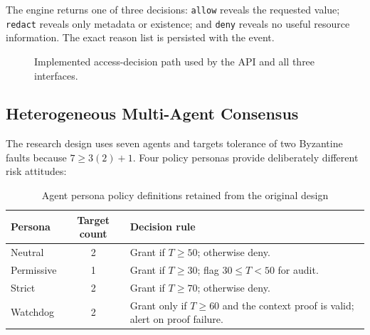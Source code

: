 \documentclass[10pt]{article}
\begin{document}
The engine returns one of three decisions: \texttt{allow} reveals the requested value; \texttt{redact} reveals only metadata or existence; and \texttt{deny} reveals no useful resource information. The exact reason list is persisted with the event.

\begin{figure}[ht]
\centering
{}
\caption{Implemented access-decision path used by the API and all three interfaces.}
\label{fig:decision}
\end{figure}

\subsection*{Heterogeneous Multi-Agent Consensus}

The research design uses seven agents and targets tolerance of two Byzantine faults because $7\geq 3(2)+1$. Four policy personas provide deliberately different risk attitudes:

\begin{table}[ht]
\centering
\caption{Agent persona policy definitions retained from the original design}
\label{tab:personas}
\begin{tabularx}{\textwidth}{l c Y}
\toprule
\textbf{Persona} & \textbf{Target count} & \textbf{Decision rule}\\
\midrule
Neutral & 2 & Grant if $T\geq50$; otherwise deny.\\
Permissive & 1 & Grant if $T\geq30$; flag $30\leq T<50$ for audit.\\
Strict & 2 & Grant if $T\geq70$; otherwise deny.\\
Watchdog & 2 & Grant only if $T\geq60$ and the context proof is valid; alert on proof failure.\\
\bottomrule
\end{tabularx}
\end{table}
\end{document}
